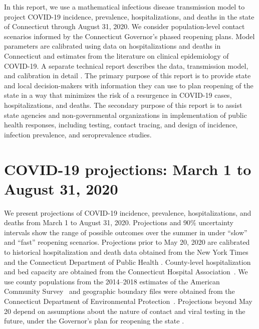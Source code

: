\documentclass[11pt]{article}
\begin{document}

In this report, we use a mathematical infectious disease transmission model to project COVID-19 incidence, prevalence, hospitalizations, and deaths in the state of Connecticut through August 31, 2020.  We consider population-level contact scenarios informed by the Connecticut Governor's phased reopening plans.  Model parameters are calibrated using data on hospitalizations and deaths in Connecticut and estimates from the literature on clinical epidemiology of COVID-19.  A separate technical report describes the data, transmission model, and calibration in detail \citep{morozova2020tech}.  The primary purpose of this report is to provide state and local decision-makers with information they can use to plan reopening of the state in a way that minimizes the risk of a resurgence in COVID-19 cases, hospitalizations, and deaths.  The secondary purpose of this report is to assist state agencies and non-governmental organizations in implementation of public health responses, including testing, contact tracing, and design of incidence, infection prevalence, and seroprevalence studies. 



\section*{COVID-19 projections: March 1 to August 31, 2020}

We present projections of COVID-19 incidence, prevalence, hospitalizations, and deaths from March 1 to August 31, 2020.  Projections and 90\% uncertainty intervals show the range of possible outcomes over the summer in under ``slow'' and ``fast'' reopening scenarios.  Projections prior to May 20, 2020 are calibrated to historical hospitalization and death data obtained from the New York Times \citep{nyt2020Connecticut} and the Connecticut Department of Public Health \citep{DPHwebsite}.  County-level hospitalization and bed capacity are obtained from the Connecticut Hospital Association~\citep{CHAwebsite}. We use county populations from the 2014--2018 estimates of the American Community Survey~\citep{acs2018} and geographic boundary files were obtained from the Connecticut Department of Environmental Protection~\citep{shapefile}.  Projections beyond May 20 depend on assumptions about the nature of contact and viral testing in the future, under the Governor's plan for reopening the state \citep{ct2020coronavirus}.  
\end{document}
